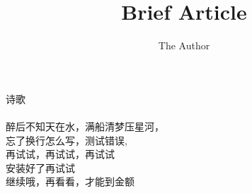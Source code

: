 \documentclass[12pt]{article}
\title{Brief Article}
\author{The Author}
\begin{document}
\maketitle 诗歌
\paragraph{}
醉后不知天在水，满船清梦压星河，\\
忘了换行怎么写，测试错误,\\
再试试，再试试，再试试\\
安装好了再试试\\
继续哦，再看看，才能到金额\\
\end{document}
